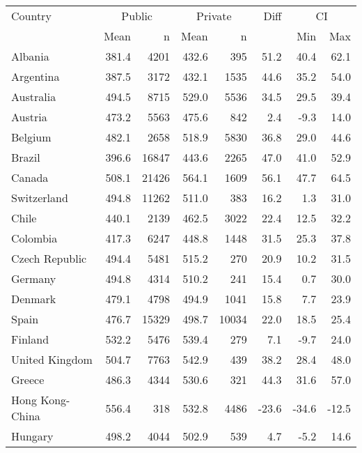 \begin{table}[ht]
\begin{center}
{\smaller
\begin{tabular}{lrr@{\extracolsep{10pt}}rr@{\extracolsep{10pt}}rrr}
  \hline
  Country & \multicolumn{2}{c}{Public} & \multicolumn{2}{c}{Private} & Diff & \multicolumn{2}{c}{CI} \\ \cline{2-3} \cline{4-5} \cline{7-8} & Mean & n & Mean & n & & Min & Max \\ \hline
Albania & 381.4 & 4201 & 432.6 & 395 & 51.2 & 40.4 & 62.1 \\ 
  Argentina & 387.5 & 3172 & 432.1 & 1535 & 44.6 & 35.2 & 54.0 \\ 
  Australia & 494.5 & 8715 & 529.0 & 5536 & 34.5 & 29.5 & 39.4 \\ 
  Austria & 473.2 & 5563 & 475.6 & 842 & 2.4 & -9.3 & 14.0 \\ 
  Belgium & 482.1 & 2658 & 518.9 & 5830 & 36.8 & 29.0 & 44.6 \\ 
  Brazil & 396.6 & 16847 & 443.6 & 2265 & 47.0 & 41.0 & 52.9 \\ 
  Canada & 508.1 & 21426 & 564.1 & 1609 & 56.1 & 47.7 & 64.5 \\ 
  Switzerland & 494.8 & 11262 & 511.0 & 383 & 16.2 & 1.3 & 31.0 \\ 
  Chile & 440.1 & 2139 & 462.5 & 3022 & 22.4 & 12.5 & 32.2 \\ 
  Colombia & 417.3 & 6247 & 448.8 & 1448 & 31.5 & 25.3 & 37.8 \\ 
  Czech Republic & 494.4 & 5481 & 515.2 & 270 & 20.9 & 10.2 & 31.5 \\ 
  Germany & 494.8 & 4314 & 510.2 & 241 & 15.4 & 0.7 & 30.0 \\ 
  Denmark & 479.1 & 4798 & 494.9 & 1041 & 15.8 & 7.7 & 23.9 \\ 
  Spain & 476.7 & 15329 & 498.7 & 10034 & 22.0 & 18.5 & 25.4 \\ 
  Finland & 532.2 & 5476 & 539.4 & 279 & 7.1 & -9.7 & 24.0 \\ 
  United Kingdom & 504.7 & 7763 & 542.9 & 439 & 38.2 & 28.4 & 48.0 \\ 
  Greece & 486.3 & 4344 & 530.6 & 321 & 44.3 & 31.6 & 57.0 \\ 
  Hong Kong-China & 556.4 & 318 & 532.8 & 4486 & -23.6 & -34.6 & -12.5 \\ 
  Hungary & 498.2 & 4044 & 502.9 & 539 & 4.7 & -5.2 & 14.6 \\ 

\end{tabular}}
\end{center}
\end{table}
